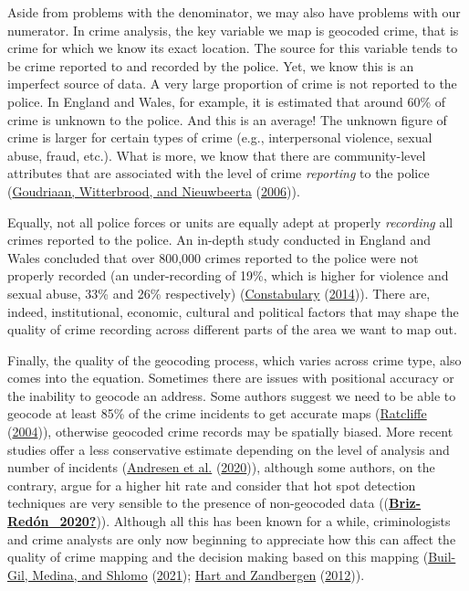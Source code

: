 \documentclass[
  krantz2]{krantz}
\begin{document}
Aside from problems with the denominator, we may also have problems with our numerator. In crime analysis, the key variable we map is geocoded crime, that is crime for which we know its exact location. The source for this variable tends to be crime reported to and recorded by the police. Yet, we know this is an imperfect source of data. A very large proportion of crime is not reported to the police. In England and Wales, for example, it is estimated that around 60\% of crime is unknown to the police. And this is an average! The unknown figure of crime is larger for certain types of crime (e.g., interpersonal violence, sexual abuse, fraud, etc.). What is more, we know that there are community-level attributes that are associated with the level of crime \emph{reporting} to the police (\protect\hyperlink{ref-Goudriaan_2006}{Goudriaan, Witterbrood, and Nieuwbeerta} (\protect\hyperlink{ref-Goudriaan_2006}{2006})).

Equally, not all police forces or units are equally adept at properly \emph{recording} all crimes reported to the police. An in-depth study conducted in England and Wales concluded that over 800,000 crimes reported to the police were not properly recorded (an under-recording of 19\%, which is higher for violence and sexual abuse, 33\% and 26\% respectively) (\protect\hyperlink{ref-HMIC_2014}{Constabulary} (\protect\hyperlink{ref-HMIC_2014}{2014})). There are, indeed, institutional, economic, cultural and political factors that may shape the quality of crime recording across different parts of the area we want to map out.

Finally, the quality of the geocoding process, which varies across crime type, also comes into the equation. Sometimes there are issues with positional accuracy or the inability to geocode an address. Some authors suggest we need to be able to geocode at least 85\% of the crime incidents to get accurate maps (\protect\hyperlink{ref-Ratcliffe_2004}{Ratcliffe} (\protect\hyperlink{ref-Ratcliffe_2004}{2004})), otherwise geocoded crime records may be spatially biased. More recent studies offer a less conservative estimate depending on the level of analysis and number of incidents (\protect\hyperlink{ref-Andresen_2020}{Andresen et al.} (\protect\hyperlink{ref-Andresen_2020}{2020})), although some authors, on the contrary, argue for a higher hit rate and consider that hot spot detection techniques are very sensible to the presence of non-geocoded data ((\protect\hyperlink{ref-Briz-Reduxf3n_2020}{\textbf{Briz-Redón\_2020?}})). Although all this has been known for a while, criminologists and crime analysts are only now beginning to appreciate how this can affect the quality of crime mapping and the decision making based on this mapping (\protect\hyperlink{ref-Buil-Gil_2021}{Buil-Gil, Medina, and Shlomo} (\protect\hyperlink{ref-Buil-Gil_2021}{2021}); \protect\hyperlink{ref-Hart_2012}{Hart and Zandbergen} (\protect\hyperlink{ref-Hart_2012}{2012})).
\end{document}
